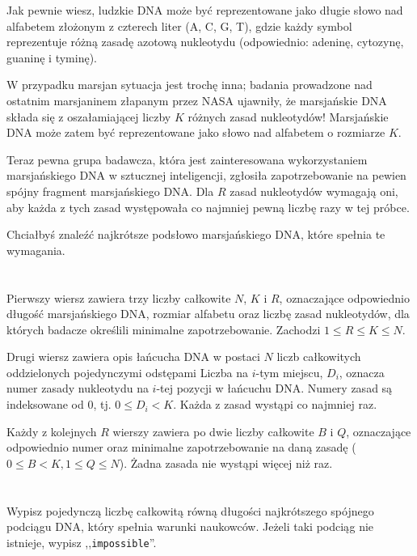 \ifx\boi\undefined\fi
\def\version{jury-1}
Jak pewnie wiesz, ludzkie DNA może być reprezentowane jako długie słowo nad
alfabetem złożonym z czterech liter ({A, C, G, T}), gdzie każdy symbol reprezentuje
różną zasadę azotową nukleotydu (odpowiednio: adeninę, cytozynę, guaninę i tyminę).

W przypadku marsjan sytuacja jest trochę inna; badania prowadzone nad ostatnim
marsjaninem złapanym przez NASA ujawniły, że marsjańskie DNA składa się z oszałamiającej
liczby $K$ różnych zasad nukleotydów! Marsjańskie DNA może zatem być reprezentowane
jako słowo nad alfabetem o rozmiarze $K$.

Teraz pewna grupa badawcza, która jest zainteresowana wykorzystaniem marsjańskiego DNA
w sztucznej inteligencji, zgłosiła zapotrzebowanie na pewien spójny fragment marsjańskiego DNA.
Dla $R$ zasad nukleotydów wymagają oni, aby każda z tych zasad występowała co najmniej pewną liczbę razy w tej próbce.

Chciałbyś znaleźć najkrótsze podsłowo marsjańskiego DNA, które spełnia te wymagania.

\section*{}
Pierwszy wiersz zawiera trzy liczby całkowite $N$, $K$ i $R$, oznaczające
odpowiednio długość marsjańskiego DNA, rozmiar alfabetu oraz liczbę zasad nukleotydów,
dla których badacze określili minimalne zapotrzebowanie. Zachodzi $1 \le R \le K \le N$.

Drugi wiersz zawiera opis łańcucha DNA w postaci $N$ liczb całkowitych oddzielonych
pojedynczymi odstępami
Liczba na $i$-tym miejscu, $D_i$, oznacza numer zasady nukleotydu na $i$-tej pozycji w łańcuchu DNA.
Numery zasad są indeksowane od $0$, tj. $0 \leq D_i < K$. Każda z zasad wystąpi
co najmniej raz.

Każdy z kolejnych $R$ wierszy zawiera po dwie liczby całkowite $B$ i $Q$, oznaczające odpowiednio
numer oraz minimalne zapotrzebowanie na daną zasadę ($0 \le B < K, 1 \le Q \le N$).
Żadna zasada nie wystąpi więcej niż raz.

\section*{\outputsection}
Wypisz pojedynczą liczbę całkowitą równą długości najkrótszego spójnego podciągu DNA,
który spełnia warunki naukowców. Jeżeli taki podciąg nie istnieje,
wypisz ,,\texttt{impossible}''.

